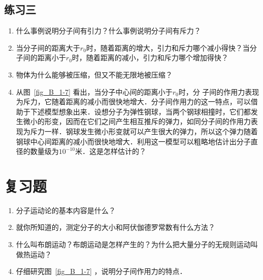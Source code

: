 \subsection*{练习三}
\begin{enumerate}
	\item 什么事例说明分子间有引力？什么事例说明分子间有斥力？
	\item 当分子间的距离大于$r_0$时，随着距离的增大，引力和斥力哪个减小得快？当分子间的距离小于$r_0$时，随着距离的减小，引力和斥力哪个增加得快？
	\item 物体为什么能够被压缩，但又不能无限地被压缩？
\item	从图~\ref{fig_B_1-7} 看出，当分子中心间的距离小于$r_0$时，分
子间的作用力表现为斥力，它随着距离的减小而很快地增大．分子间作用力的这一特点，可以借助于下述模型想象出来．设想分子为弹性钢球，当两个钢球相撞时，它们都发生微小的形变，因而在它们之间产生相互推斥的弹力，如同分子间的作用力表现为斥力一样．钢球发生微小形变就可以产生很大的弹力，所以这个弹力随着钢球中心间距离的减小而很快地增大．利用这一模型可以粗略地估计出分子直径的数量级为$10^{-10}$米．这是怎样估计的？

\end{enumerate}

\section*{复习题}
\begin{enumerate}
\item 分子运动论的基本内容是什么？
\item 就你所知道的，测定分子的大小和阿伏伽德罗常数有什么方法？
\item 什么叫布朗运动？布朗运动是怎样产生的？为什么把大量分子的无规则运动叫做热运动？
\item 仔细研究图~\ref{fig_B_1-7} ，说明分子间作用力的特点．
\end{enumerate}






